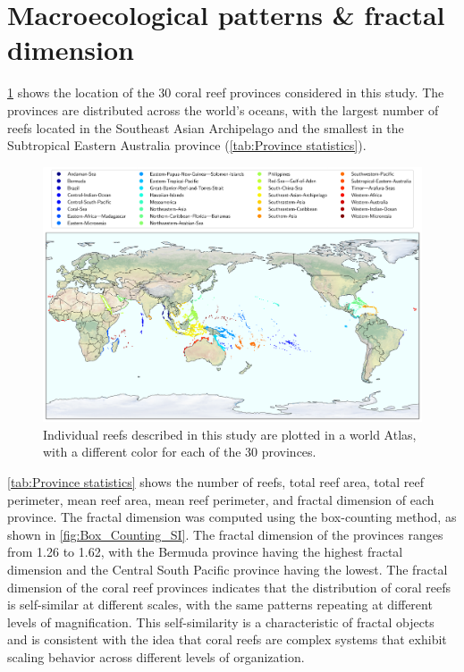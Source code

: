 \section{Macroecological patterns \& fractal dimension}

\cref{fig:reef-map} shows the location of the 30 coral reef provinces
considered in this study. The provinces are distributed across the world's
oceans, with the largest number of reefs located in the Southeast Asian
Archipelago and the smallest in the Subtropical Eastern Australia province
(\cref{tab:Province statistics}).

\begin{figure}[H]
    \centering
    \includegraphics[width=\textwidth]{Figures/Coral_reef_centroids.pdf}
    \caption{Individual reefs described in this study are plotted in a world
        Atlas, with a different color for each of the 30 provinces.}
    \label{fig:reef-map}
\end{figure}

\cref{tab:Province statistics} shows the number of reefs, total reef area,
total reef perimeter, mean reef area, mean reef perimeter, and fractal
dimension of each province. The fractal dimension was computed using the
box-counting method, as shown in \cref{fig:Box_Counting_SI}. The fractal
dimension of the provinces ranges from 1.26 to 1.62, with the Bermuda province
having the highest fractal dimension and the Central South Pacific province
having the lowest. The fractal dimension of the coral reef
provinces indicates that the distribution of coral reefs is self-similar at
different scales, with the same patterns repeating at different levels of
magnification. This self-similarity is a characteristic of fractal objects and
is consistent with the idea that coral reefs are complex systems that exhibit
scaling behavior across different levels of organization.

